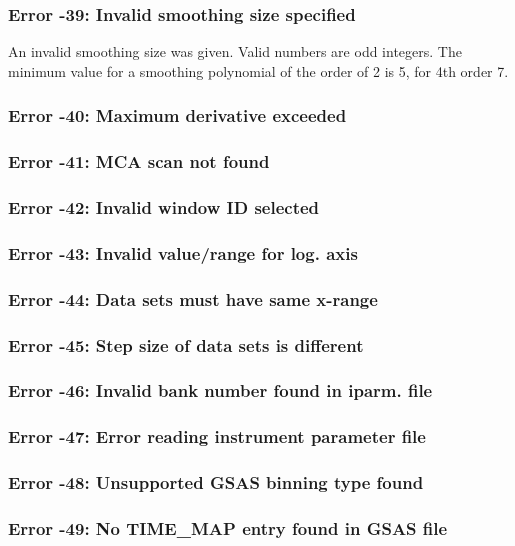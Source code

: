 \subsubsection{Error -39: Invalid smoothing size specified}
\par
An invalid smoothing size was given. Valid numbers are odd 
integers. The minimum value for a smoothing polynomial of the 
order of 2 is 5, for 4th order 7. 
\subsubsection{Error -40: Maximum derivative exceeded}
\subsubsection{Error -41: MCA scan not found}
\subsubsection{Error -42: Invalid window ID selected}
\subsubsection{Error -43: Invalid value/range for log. axis}
\subsubsection{Error -44: Data sets must have same x-range}
\subsubsection{Error -45: Step size of data sets is different}
\subsubsection{Error -46: Invalid bank number found in iparm. file}
\subsubsection{Error -47: Error reading instrument parameter file}
\subsubsection{Error -48: Unsupported GSAS binning type found}
\subsubsection{Error -49: No TIME\_MAP entry found in GSAS file}
